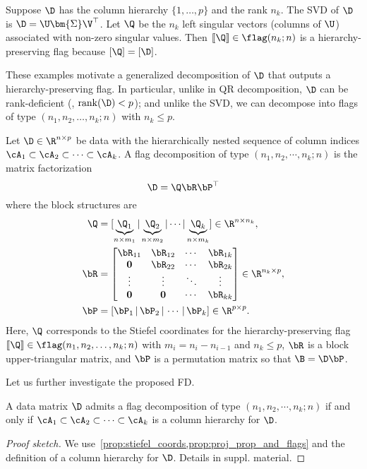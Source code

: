 \begin{exmp}[SVD]
    Suppose $\D$ has the column hierarchy $\{1,\dots,p\}$ and the rank $n_k$. The SVD of $\D$ is $\D =\U \bm{\Sigma} \V^\top$. Let $\Q$ be the $n_k$ left singular vectors (columns of $\U$) associated with non-zero singular values. Then $[\![\Q]\!] \in \flag(n_k;n)$ is a hierarchy-preserving flag because $[\Q] = [\D]$.
\end{exmp}

These examples motivate a generalized decomposition of $\D$ that outputs a hierarchy-preserving flag. In particular, unlike in QR decomposition, $\D$ can be rank-deficient (\eg, $\mathrm{rank}(\D) < p$); and unlike the SVD, we can decompose into flags of type $(n_1,n_2,\dots,n_k;n)$ with $n_k \leq p$. 

\begin{dfn}
    Let $\D \in \R^{n \times p}$ be data with the hierarchically nested sequence of column indices $\cA_1 \subset \cA_2 \subset \cdots \subset \cA_k$. A flag decomposition of type $(n_1,n_2, \cdots, n_k; n)$ is the matrix factorization
    \begin{equation}
        \D = \Q \bR \bP^\top
    \end{equation}
    where the block structures are
    \begin{align}
        \Q &= [\underbrace{\Q_1}_{n \times m_1} | \underbrace{\Q_2}_{n \times m_2} | \cdots | \underbrace{\Q_k}_{n \times m_k} ] \in \R^{n \times n_k},\\
        \bR &= \begin{bmatrix}
            \bR_{11} & \bR_{12} & \cdots & \bR_{1k}\\
            \mathbf{0} & \bR_{22} & \cdots & \bR_{2k}\\
            \vdots & \vdots & \ddots & \vdots\\
            \mathbf{0} & \mathbf{0} & \cdots & \bR_{kk} \end{bmatrix} \in \R^{n_k \times p}, \\
        \bP &= [\bP_1 \,|\, \bP_2 \,|\, \cdots \,|\, \bP_k] \in \R^{p \times p}.
    \end{align}
    Here, $\Q$ corresponds to the Stiefel coordinates for the hierarchy-preserving flag $[\![\Q]\!] \in \flag(n_1,n_2,\dots, n_k;n)$ with $m_i=n_i - n_{i-1}$ and $n_k \leq p$, $\bR$ is a block upper-triangular matrix, and $\bP$ is a permutation matrix so that $\B = \D \bP$.
\end{dfn}
 Let us further investigate the proposed FD. 
\begin{prop}
    A data matrix $\D$ admits a flag decomposition of type $(n_1,n_2, \cdots, n_k; n)$ if and only if $\cA_1 \subset \cA_2 \subset \cdots \subset \cA_k$ is a column hierarchy for $\D$.
\end{prop}
\begin{proof}[Proof sketch]
    We use~\cref{prop:stiefel_coords,prop:proj_prop_and_flags} and the definition of a column hierarchy for $\D$. Details in suppl. material.
\end{proof}


